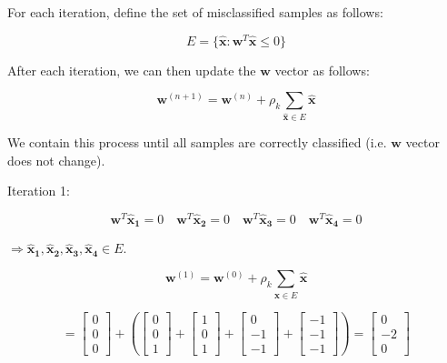 \documentclass[fleqn]{article}
\begin{document}
\begin{enumerate}
		For each iteration, define the set of misclassified samples as follows:
		
		\begin{equation*}
			E = \{\mathbf{\hat{x}}: \mathbf{w}^T\mathbf{\hat{x}} \leq 0\}
		\end{equation*}
		
		After each iteration, we can then update the $\mathbf{w}$ vector as follows:
		
		\begin{equation*}
			\mathbf{w}^{(n+1)} = \mathbf{w}^{(n)} + \rho_k\sum_{\mathbf{\hat{x}} \in E}{\mathbf{\hat{x}}}
		\end{equation*}
		
		We contain this process until all samples are correctly classified (i.e. $\mathbf{w}$ vector does not change).
		
		Iteration 1:
		
		\begin{equation*}
			\mathbf{w}^T\mathbf{\hat{x}_1} = 0 \quad \mathbf{w}^T\mathbf{\hat{x}_2} = 0 \quad \mathbf{w}^T\mathbf{\hat{x}_3} = 0 \quad \mathbf{w}^T\mathbf{\hat{x}_4} = 0
		\end{equation*}
		
		$\Rightarrow \mathbf{\hat{x}_1}, \mathbf{\hat{x}_2}, \mathbf{\hat{x}_3}, \mathbf{\hat{x}_4} \in E$.
		
		\begin{equation*}
			\mathbf{w}^{(1)} = \mathbf{w}^{(0)} + \rho_k\sum_{\mathbf{\hat{x}} \in E}{\mathbf{\hat{x}}}
		\end{equation*}
			
		\begin{equation*}
			= \begin{bmatrix} 0 \\ 0 \\ 0 \end{bmatrix}			 + \left(\begin{bmatrix}0\\0\\1\end{bmatrix} + \begin{bmatrix}1\\0\\1\end{bmatrix} + \begin{bmatrix}0\\-1\\-1\end{bmatrix} + \begin{bmatrix}-1\\-1\\-1\end{bmatrix}\right) = \begin{bmatrix}0\\-2\\0\end{bmatrix}
		\end{equation*}
		

\end{enumerate}
\end{document}
